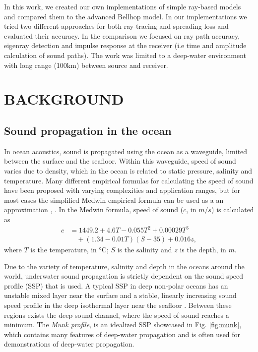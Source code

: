 \documentclass[fleqn]{jaes}
\begin{document}
In this work, we created our own implementations of simple ray-based models and compared them to the advanced Bellhop model. In our implementations we tried two different approaches for both ray-tracing and spreading loss and evaluated their accuracy. In the comparison we focused on ray path accuracy, eigenray detection and impulse response at the receiver (i.e time and amplitude calculation of sound paths). The work was limited to a deep-water environment with long range (100km) between source and receiver.

\section{BACKGROUND}

\subsection{Sound propagation in the ocean}
In ocean acoustics, sound is propagated using the ocean as a waveguide, limited between the surface and the seafloor. Within this waveguide, speed of sound varies due to density, which in the ocean is related to static pressure, salinity and temperature. Many different empirical formulas for calculating the speed of sound have been proposed \cite{Huang} with varying complexities and application ranges, but for most cases the simplified Medwin empirical formula can be used as a an approximation \cite{Jensen}, \cite{Lurton}. In the Medwin formula, speed of sound ($c$, in $m/s$) is calculated as
\begin{equation}
\begin{split}
c &= 1449.2 + 4.6T - 0.055T^2 + 0.00029T^3 \\
  &\quad + (1.34 - 0.01T)(S-35) + 0.016z,
\end{split}
\label{eq:speedofsound}
\end{equation}
where $T$ is the temperature, in °C; $S$ is the salinity and $z$ is the depth, in $m$.

Due to the variety of temperature, salinity and depth in the oceans around the world, underwater sound propagation is strictly dependent on the sound speed profile (SSP) that is used. A typical SSP in deep non-polar oceans has an unstable mixed layer near the surface and a stable, linearly increasing sound speed profile in the deep isothermal layer near the seafloor \cite{Jensen}. Between these regions exists the deep sound channel, where the speed of sound reaches a minimum. The \textit{Munk profile}, is an idealized SSP showcased in Fig. \ref{fig:munk}, which contains many features of deep-water propagation and is often used for demonstrations of deep-water propagation.
\end{document}

